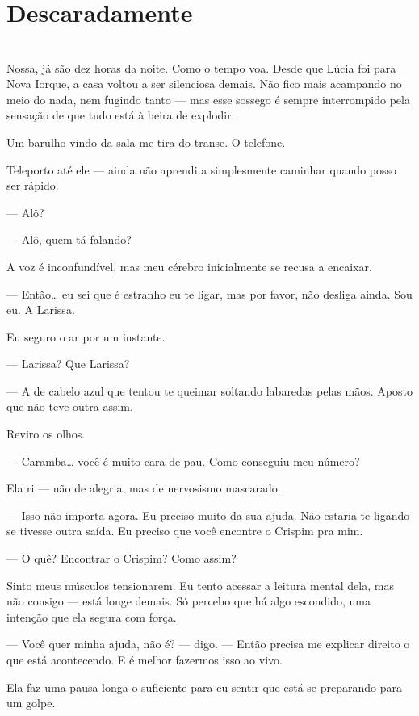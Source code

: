 \newpage
\ifdefined\useChapters
\chapter{Descaradamente}
\else
\chapter{}
\fi

Nossa, já são dez horas da noite. Como o tempo voa.  
Desde que Lúcia foi para Nova Iorque, a casa voltou a ser silenciosa demais. Não fico mais acampando no meio do nada, nem fugindo tanto — mas esse sossego é sempre interrompido pela sensação de que tudo está à beira de explodir.

Um barulho vindo da sala me tira do transe.  
O telefone.

Teleporto até ele — ainda não aprendi a simplesmente caminhar quando posso ser rápido.

— Alô?

— Alô, quem tá falando?

A voz é inconfundível, mas meu cérebro inicialmente se recusa a encaixar.

— Então… eu sei que é estranho eu te ligar, mas por favor, não desliga ainda. Sou eu. A Larissa.

Eu seguro o ar por um instante.

— Larissa? Que Larissa?

— A de cabelo azul que tentou te queimar soltando labaredas pelas mãos. Aposto que não teve outra assim.

Reviro os olhos.

— Caramba… você é muito cara de pau. Como conseguiu meu número?

Ela ri — não de alegria, mas de nervosismo mascarado.

— Isso não importa agora. Eu preciso muito da sua ajuda. Não estaria te ligando se tivesse outra saída.  
Eu preciso que você encontre o Crispim pra mim.

— O quê? Encontrar o Crispim? Como assim?

Sinto meus músculos tensionarem.  
Eu tento acessar a leitura mental dela, mas não consigo — está longe demais. Só percebo que há algo escondido, uma intenção que ela segura com força.

— Você quer minha ajuda, não é? — digo. — Então precisa me explicar direito o que está acontecendo. E é melhor fazermos isso ao vivo.

Ela faz uma pausa longa o suficiente para eu sentir que está se preparando para um golpe.

